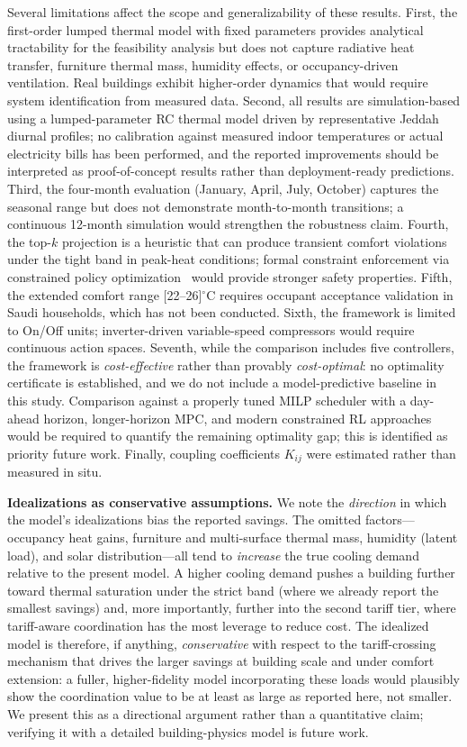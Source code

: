 \documentclass[12pt,a4paper]{article}
\begin{document}
Several limitations affect the scope and generalizability of these results. First, the first-order lumped thermal model with fixed parameters provides analytical tractability for the feasibility analysis but does not capture radiative heat transfer, furniture thermal mass, humidity effects, or occupancy-driven ventilation. Real buildings exhibit higher-order dynamics that would require system identification from measured data. Second, all results are simulation-based using a lumped-parameter RC thermal model driven by representative Jeddah diurnal profiles; no calibration against measured indoor temperatures or actual electricity bills has been performed, and the reported improvements should be interpreted as proof-of-concept results rather than deployment-ready predictions. Third, the four-month evaluation (January, April, July, October) captures the seasonal range but does not demonstrate month-to-month transitions; a continuous 12-month simulation would strengthen the robustness claim. Fourth, the top-$k$ projection is a heuristic that can produce transient comfort violations under the tight band in peak-heat conditions; formal constraint enforcement via constrained policy optimization~\cite{ref37} would provide stronger safety properties. Fifth, the extended comfort range [22--26]$^\circ$C requires occupant acceptance validation in Saudi households, which has not been conducted. Sixth, the framework is limited to On/Off units; inverter-driven variable-speed compressors would require continuous action spaces. Seventh, while the comparison includes five controllers, the framework is \textit{cost-effective} rather than provably \textit{cost-optimal}: no optimality certificate is established, and we do not include a model-predictive baseline in this study. Comparison against a properly tuned MILP scheduler with a day-ahead horizon, longer-horizon MPC, and modern constrained RL approaches would be required to quantify the remaining optimality gap; this is identified as priority future work. Finally, coupling coefficients $K_{ij}$ were estimated rather than measured in situ.

\textbf{Idealizations as conservative assumptions.} We note the \emph{direction} in which the model's idealizations bias the reported savings. The omitted factors---occupancy heat gains, furniture and multi-surface thermal mass, humidity (latent load), and solar distribution---all tend to \emph{increase} the true cooling demand relative to the present model. A higher cooling demand pushes a building further toward thermal saturation under the strict band (where we already report the smallest savings) and, more importantly, further into the second tariff tier, where tariff-aware coordination has the most leverage to reduce cost. The idealized model is therefore, if anything, \emph{conservative} with respect to the tariff-crossing mechanism that drives the larger savings at building scale and under comfort extension: a fuller, higher-fidelity model incorporating these loads would plausibly show the coordination value to be at least as large as reported here, not smaller. We present this as a directional argument rather than a quantitative claim; verifying it with a detailed building-physics model is future work.
\end{document}
